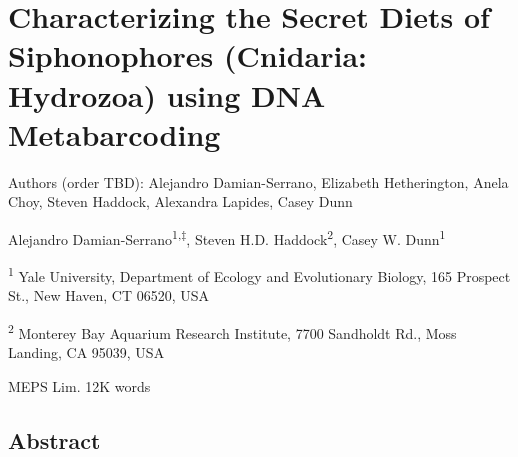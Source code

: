 \documentclass[12pt,]{article}
\title{}
\author{}
\date{}
\begin{document}
\hypertarget{characterizing-the-secret-diets-of-siphonophores-cnidaria-hydrozoa-using-dna-metabarcoding}{%
\section{Characterizing the Secret Diets of Siphonophores (Cnidaria: Hydrozoa) using DNA Metabarcoding}\label{characterizing-the-secret-diets-of-siphonophores-cnidaria-hydrozoa-using-dna-metabarcoding}}

Authors (order TBD): Alejandro Damian-Serrano, Elizabeth Hetherington, Anela Choy, Steven Haddock, Alexandra Lapides, Casey Dunn

Alejandro Damian-Serrano\textsuperscript{1,‡}, Steven H.D. Haddock\textsuperscript{2}, Casey W. Dunn\textsuperscript{1}

\textsuperscript{1} Yale University, Department of Ecology and Evolutionary Biology, 165 Prospect St., New Haven, CT 06520, USA

\textsuperscript{2} Monterey Bay Aquarium Research Institute, 7700 Sandholdt Rd., Moss Landing, CA 95039, USA

MEPS Lim. 12K words

\newpage

\hypertarget{abstract}{%
\subsection*{Abstract}\label{abstract}}
\end{document}
